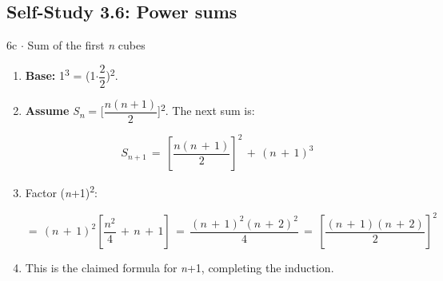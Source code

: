 \documentclass[11pt]{article}
\begin{document}
\begin{keepsection}\subsection{Self-Study 3.6: Power sums}

\begin{workedbox}{6c \ensuremath{\cdot} Sum of the first \textit{n} cubes}
\begin{enumerate}
\item \textbf{Base:} 1\textsuperscript{3} = (1\ensuremath{\cdot}{\small\ensuremath{\dfrac{2}{2}}})\textsuperscript{2}.
\item {}
\textbf{Assume} \textit{S}\textsubscript{\textit{n}} = [{\small\ensuremath{\dfrac{{n}({n}+1)}{2}}}]\textsuperscript{2}. The next sum is:

\begin{equation*}{S}_{{n}+1}\, =\, \left[\dfrac{{n}({n}\, +\, 1)}{2}\right]^{2}\, +\, ({n}\, +\, 1)^{3}\end{equation*}
\item {}
Factor (\textit{n}+1)\textsuperscript{2}:

\begin{equation*}=\, ({n}\, +\, 1)^{2}\left[\dfrac{{n}^{2}}{4}\, +\, {n}\, +\, 1\right]\, =\, \dfrac{({n}\, +\, 1)^{2}({n}\, +\, 2)^{2}}{4}\, =\, \left[\dfrac{({n}\, +\, 1)({n}\, +\, 2)}{2}\right]^{2}\end{equation*}
\item This is the claimed formula for \textit{n}+1, completing the induction.
\end{enumerate}
\end{workedbox}

\end{keepsection}
\end{document}
